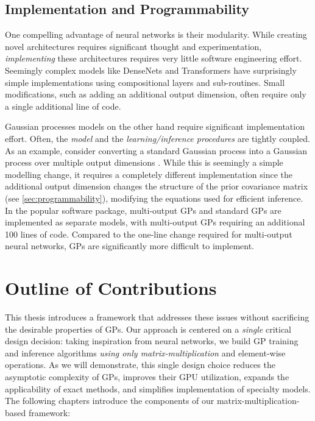 \subsection{Implementation and Programmability}
One compelling advantage of neural networks is their modularity.
While creating novel architectures requires significant thought and experimentation, \emph{implementing} these architectures requires very little software engineering effort.
Seemingly complex models like DenseNets \cite{huang2017densely} and Transformers \cite{vaswani2017attention} have surprisingly simple implementations using compositional layers and sub-routines.
Small modifications, such as adding an additional output dimension, often require only a single additional line of code.

Gaussian processes models on the other hand require significant implementation effort.
Often, the \emph{model} and the \emph{learning/inference procedures} are tightly coupled.
As an example, consider converting a standard Gaussian process into a Gaussian process over multiple output dimensions \cite{bonilla2008multi}.
While this is seemingly a simple modelling change, it requires a completely different implementation since the additional output dimension changes the structure of the prior covariance matrix (see \cref{sec:programmability}), modifying the equations used for efficient inference.
In the popular \citet{gpy2014} software package, multi-output GPs and standard GPs are implemented as separate models, with multi-output GPs requiring an additional 100 lines of code.
Compared to the one-line change required for multi-output neural networks, GPs are significantly more difficult to implement.



\section{Outline of Contributions}
This thesis introduces a framework that addresses these issues without sacrificing the desirable properties of GPs.
Our approach is centered on a \emph{single} critical design decision:
taking inspiration from neural networks, we build GP training and inference algorithms \emph{using only matrix-multiplication} and element-wise operations.
As we will demonstrate, this single design choice reduces the asymptotic complexity of GPs, improves their GPU utilization, expands the applicability of exact methods, and simplifies implementation of specialty models.
The following chapters introduce the components of our matrix-multiplication-based framework:

